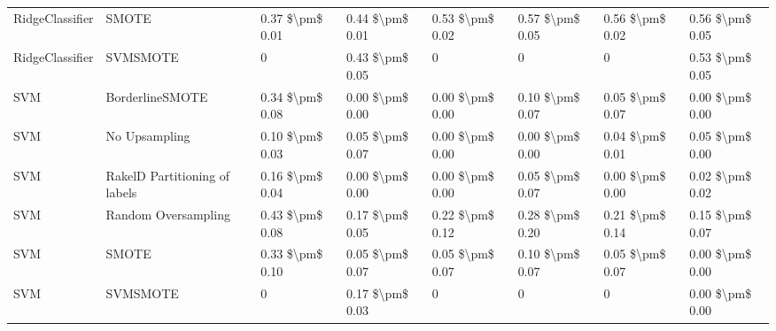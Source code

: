 \begin{tabular}{llllllll}
                RidgeClassifier &                         SMOTE & 0.37 \$\textbackslash pm\$ 0.01 &           0.44 \$\textbackslash pm\$ 0.01 &       0.53 \$\textbackslash pm\$ 0.02 &        0.57 \$\textbackslash pm\$ 0.05 &                         0.56 \$\textbackslash pm\$ 0.02 &     0.56 \$\textbackslash pm\$ 0.05 \\
                RidgeClassifier &                      SVMSMOTE &               0 &           0.43 \$\textbackslash pm\$ 0.05 &                     0 &                      0 &                                       0 &     0.53 \$\textbackslash pm\$ 0.05 \\
                            SVM &               BorderlineSMOTE & 0.34 \$\textbackslash pm\$ 0.08 &           0.00 \$\textbackslash pm\$ 0.00 &       0.00 \$\textbackslash pm\$ 0.00 &        0.10 \$\textbackslash pm\$ 0.07 &                         0.05 \$\textbackslash pm\$ 0.07 &     0.00 \$\textbackslash pm\$ 0.00 \\
                            SVM &                 No Upsampling & 0.10 \$\textbackslash pm\$ 0.03 &           0.05 \$\textbackslash pm\$ 0.07 &       0.00 \$\textbackslash pm\$ 0.00 &        0.00 \$\textbackslash pm\$ 0.00 &                         0.04 \$\textbackslash pm\$ 0.01 &     0.05 \$\textbackslash pm\$ 0.00 \\
                            SVM & RakelD Partitioning of labels & 0.16 \$\textbackslash pm\$ 0.04 &           0.00 \$\textbackslash pm\$ 0.00 &       0.00 \$\textbackslash pm\$ 0.00 &        0.05 \$\textbackslash pm\$ 0.07 &                         0.00 \$\textbackslash pm\$ 0.00 &     0.02 \$\textbackslash pm\$ 0.02 \\
                            SVM &           Random Oversampling & 0.43 \$\textbackslash pm\$ 0.08 &           0.17 \$\textbackslash pm\$ 0.05 &       0.22 \$\textbackslash pm\$ 0.12 &        0.28 \$\textbackslash pm\$ 0.20 &                         0.21 \$\textbackslash pm\$ 0.14 &     0.15 \$\textbackslash pm\$ 0.07 \\
                            SVM &                         SMOTE & 0.33 \$\textbackslash pm\$ 0.10 &           0.05 \$\textbackslash pm\$ 0.07 &       0.05 \$\textbackslash pm\$ 0.07 &        0.10 \$\textbackslash pm\$ 0.07 &                         0.05 \$\textbackslash pm\$ 0.07 &     0.00 \$\textbackslash pm\$ 0.00 \\
                            SVM &                      SVMSMOTE &               0 &           0.17 \$\textbackslash pm\$ 0.03 &                     0 &                      0 &                                       0 &     0.00 \$\textbackslash pm\$ 0.00 \\

\end{tabular}
